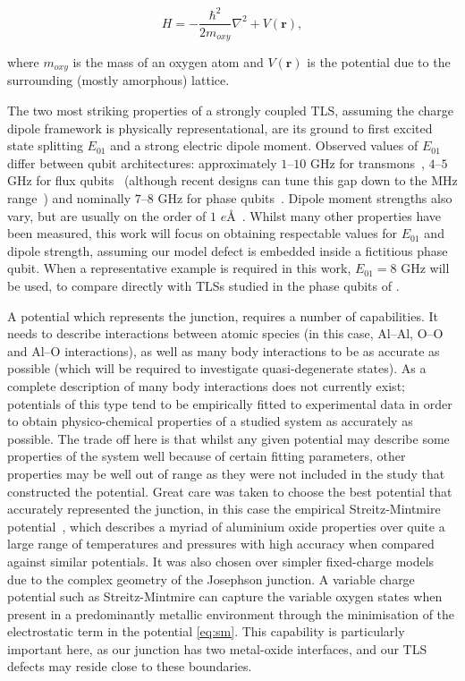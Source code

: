\begin{equation}
    H = -\frac{\hbar^2}{2m_{oxy}}\nabla^2+V(\mathbf{r}),
    \label{eq:OHam}
\end{equation}

where $m_{oxy}$ is the mass of an oxygen atom and $V(\mathbf{r})$ is the potential due to the surrounding (mostly amorphous) lattice.

The two most striking properties of a strongly coupled TLS, assuming the charge dipole framework is physically representational, are its ground to first excited state splitting $E_{01}$ and a strong electric dipole moment.
Observed values of $E_{01}$  differ between qubit architectures: approximately $1$--$10$ GHz for transmons~\cite{Koch2007}, $4$--$5$ GHz for flux qubits~\cite{Lupascu2009} (although recent designs can tune this gap down to the MHz range~\cite{Schwarz2013}) and nominally $7$--$8$ GHz for phase qubits~\cite{Cole2010}.
Dipole moment strengths also vary, but are usually on the order of $1$ $e$\AA\ \cite{Cole2010,Shalibo2010}.
Whilst many other properties have been measured, this work will focus on obtaining respectable values for $E_{01}$ and dipole strength, assuming our model defect is embedded inside a fictitious phase qubit.
When a representative example is required in this work, $E_{01}=8$ GHz will be used, to compare directly with TLSs studied in the phase qubits of .

A potential which represents the junction, requires a number of capabilities.
It needs to describe interactions between atomic species (in this case, Al--Al, O--O and Al--O interactions), as well as many body interactions to be as accurate as possible (which will be required to investigate quasi-degenerate states).
As a complete description of many body interactions does not currently exist; potentials of this type tend to be empirically fitted to experimental data in order to obtain physico-chemical properties of a studied system as accurately as possible.
The trade off here is that whilst any given potential may describe some properties of the system well because of certain fitting parameters, other properties may be well out of range as they were not included in the study that constructed the potential.
Great care was taken to choose the best potential that accurately represented the junction, in this case the empirical Streitz-Mintmire potential~\cite{Streitz1994}, which describes a myriad of aluminium oxide properties over quite a large range of temperatures and pressures with high accuracy when compared against similar potentials.
It was also chosen over simpler fixed-charge models~\cite{Catlow1982,Dienes1975} due to the complex geometry of the Josephson junction.
A variable charge potential such as Streitz-Mintmire can capture the variable oxygen states when present in a predominantly metallic environment through the minimisation of the electrostatic term in the potential \cref{eq:sm}.
This capability is particularly important here, as our junction has two metal-oxide interfaces, and our TLS defects may reside close to these boundaries.

